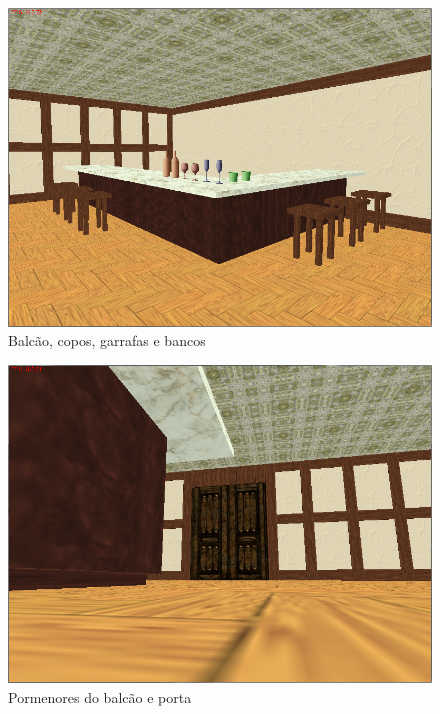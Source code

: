 \documentclass[a5paper,onecolumn, 11pt]{article}
\begin{document}
\begin{figure}[!htb]
    \centering
    \includegraphics[scale=0.5]{bar2.png}
    \caption{Balcão, copos, garrafas e bancos}
\end{figure}
\begin{figure}[!htb]
    \centering
    \includegraphics[scale=0.5]{bar10.png}
    \caption{Pormenores do balcão e porta}
\end{figure}
\end{document}
